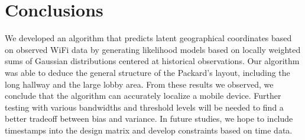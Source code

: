 \section{Conclusions}

We developed an algorithm that predicts latent geographical
coordinates based on observed WiFi data by generating likelihood
models based on locally weighted sums of Gaussian distributions
centered at historical observations.
Our algorithm was able to deduce the general structure of the
Packard's layout, including the long hallway and the large lobby area.
From these results we observed, we conclude that the algorithm can
accurately localize a mobile device.
Further testing with various bandwidths and threshold levels will be
needed to find a better tradeoff between bias and variance. In future
studies, we hope to include timestamps into the design matrix and
develop constraints based on time data.

